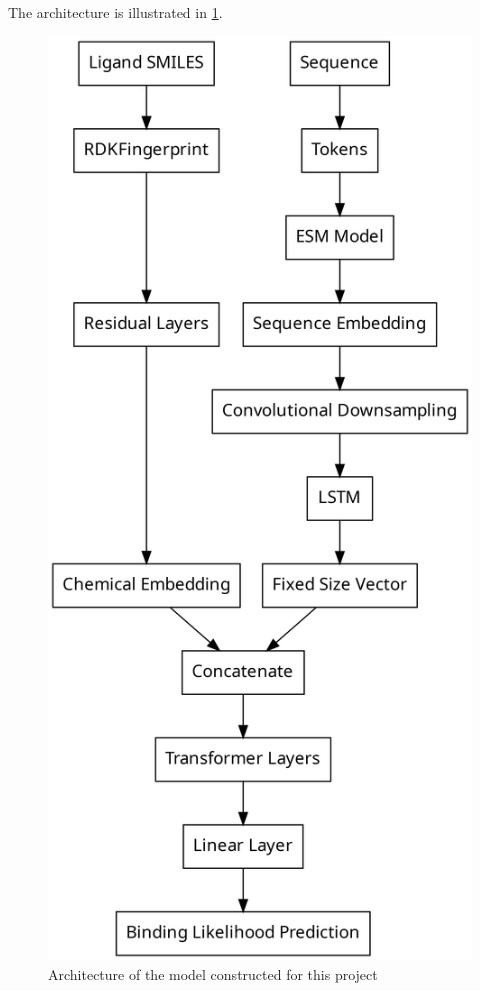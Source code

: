 \documentclass{article}
\begin{document}
The architecture is illustrated in \ref{modelarch}.

\begin{figure}
	\begin{center}
	\caption{\label{modelarch} Architecture of the model constructed for this project}
	\includegraphics[height=0.8\textheight]{img/model.png}
	\end{center}
\end{figure}
\end{document}
